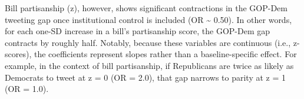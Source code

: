 \documentclass[
  11pt,
]{article}
\begin{document}
Bill partisanship (z), however, shows significant contractions in the
GOP-Dem tweeting gap once institutional control is included (OR
\textasciitilde{} 0.50). In other words, for each one-SD increase in a
bill's partisanship score, the GOP-Dem gap contracts by roughly half.
Notably, because these variables are continuous (i.e., z-scores), the
coefficients represent slopes rather than a baseline-specific effect.
For example, in the context of bill partisanship, if Republicans are
twice as likely as Democrats to tweet at z = 0 (OR = 2.0), that gap
narrows to parity at z = 1 (OR = 1.0).

\FloatBarrier
\end{document}
